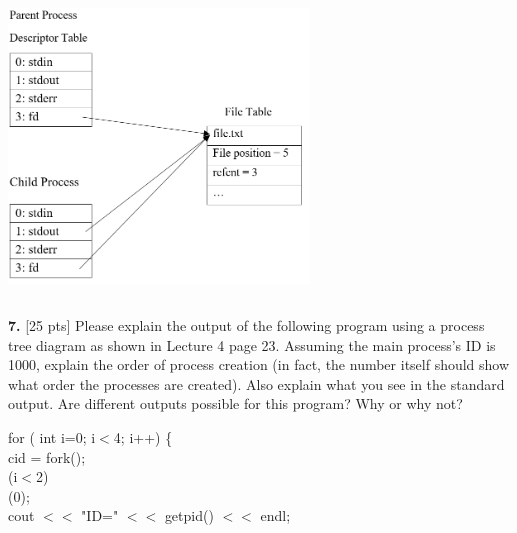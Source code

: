 \documentclass[12pt]{article}
\newcommand\tab[1][1cm]{\hspace*{#1}}
\begin{document}
\begin{center}
\includegraphics[width=8cm, height=8cm]{P6Line10}
\end{center}

{\bf 7.} [25 pts] Please explain the output of the following program using a process tree diagram as shown in Lecture 4 page 23. Assuming the main process's ID is 1000, explain the order of process creation (in fact, the number itself should show what order the processes are created). Also explain what you see in the standard output. Are different outputs possible for this program? Why or why not? 

\noindent
{\color{violet} for} ({\color{blue} int} i={\color{Green}0}; i$<${\color{Green}4}; i++) \{\\
\tab{\color{blue}int} cid = {\color{RawSienna}fork}();\\
\tab{\color{violet}if}(i$<${\color{Green}2})\\
\tab\tab{\color{RawSienna}wait}({\color{Green}0});\\
\tab cout $<<$ {\color{Maroon}"ID="} $<<$ {\color{RawSienna}getpid}() $<<$ endl;\\
\end{document}
